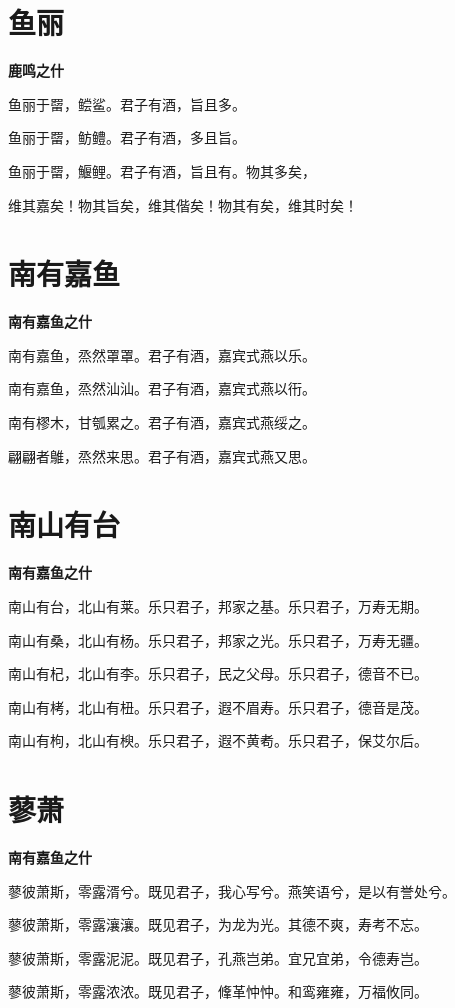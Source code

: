 \documentclass[12pt,a4paper]{ctexbook}
\begin{document}
\section{鱼丽}
\textbf{鹿鸣之什}\par\vspace{0.5em}
鱼丽于罶，鲿鲨。君子有酒，旨且多。\par
鱼丽于罶，鲂鳢。君子有酒，多且旨。\par
鱼丽于罶，鰋鲤。君子有酒，旨且有。物其多矣，\par
维其嘉矣！物其旨矣，维其偕矣！物其有矣，维其时矣！\par

\section{南有嘉鱼}
\textbf{南有嘉鱼之什}\par\vspace{0.5em}
南有嘉鱼，烝然罩罩。君子有酒，嘉宾式燕以乐。\par
南有嘉鱼，烝然汕汕。君子有酒，嘉宾式燕以衎。\par
南有樛木，甘瓠累之。君子有酒，嘉宾式燕绥之。\par
翩翩者鵻，烝然来思。君子有酒，嘉宾式燕又思。\par

\section{南山有台}
\textbf{南有嘉鱼之什}\par\vspace{0.5em}
南山有台，北山有莱。乐只君子，邦家之基。乐只君子，万寿无期。\par
南山有桑，北山有杨。乐只君子，邦家之光。乐只君子，万寿无疆。\par
南山有杞，北山有李。乐只君子，民之父母。乐只君子，德音不已。\par
南山有栲，北山有杻。乐只君子，遐不眉寿。乐只君子，德音是茂。\par
南山有枸，北山有楰。乐只君子，遐不黄耇。乐只君子，保艾尔后。\par

\section{蓼萧}
\textbf{南有嘉鱼之什}\par\vspace{0.5em}
蓼彼萧斯，零露湑兮。既见君子，我心写兮。燕笑语兮，是以有誉处兮。\par
蓼彼萧斯，零露瀼瀼。既见君子，为龙为光。其德不爽，寿考不忘。\par
蓼彼萧斯，零露泥泥。既见君子，孔燕岂弟。宜兄宜弟，令德寿岂。\par
蓼彼萧斯，零露浓浓。既见君子，鞗革忡忡。和鸾雍雍，万福攸同。\par
\end{document}

